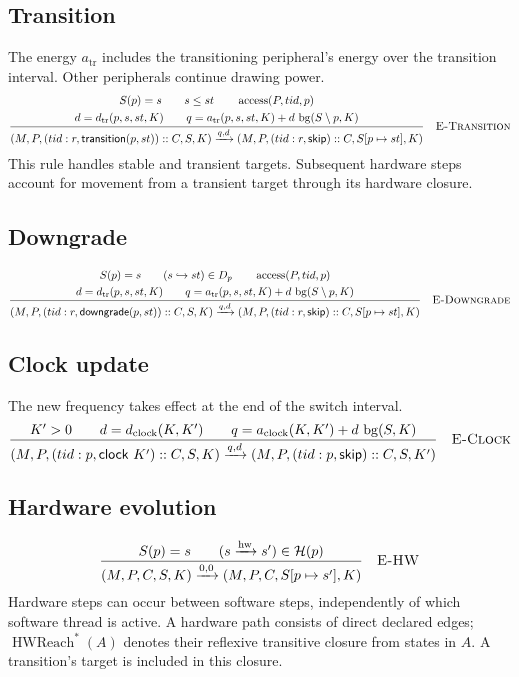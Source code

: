 \documentclass[11pt]{article}
\newcommand{\kw}[1]{\mathsf{#1}}
\newcommand{\step}[2]{\xrightarrow{#1,#2}}
\newcommand{\rulelabel}[1]{\quad\textsc{#1}}
\newcommand{\bg}{\operatorname{bg}}
\newcommand{\access}{\operatorname{access}}
\newcommand{\frm}[3]{(#1:#2,#3)}
\begin{document}
\subsection{Transition}
The energy $a_{\mathrm{tr}}$ includes the transitioning peripheral's energy
over the transition interval. Other peripherals continue drawing power.
\[
\frac{
 \begin{gathered}
 S(p)=s\qquad s\leq st\qquad\access(P,tid,p)\\
 d=d_{\mathrm{tr}}(p,s,st,K)\qquad
 q=a_{\mathrm{tr}}(p,s,st,K)+d\,\bg(S\setminus p,K)
 \end{gathered}
}{
 (M,P,\frm{tid}{r}{\kw{transition}(p,st)}::C,S,K)
 \step{q}{d}
 (M,P,\frm{tid}{r}{\kw{skip}}::C,S[p\mapsto st],K)
}\rulelabel{E-Transition}
\]
This rule handles stable and transient targets. Subsequent hardware steps
account for movement from a transient target through its hardware closure.

\subsection{Downgrade}
\[
\frac{
 \begin{gathered}
 S(p)=s\qquad(s\hookrightarrow st)\in D_p
 \qquad\access(P,tid,p)\\
 d=d_{\mathrm{tr}}(p,s,st,K)\qquad
 q=a_{\mathrm{tr}}(p,s,st,K)+d\,\bg(S\setminus p,K)
 \end{gathered}
}{
 (M,P,\frm{tid}{r}{\kw{downgrade}(p,st)}::C,S,K)
 \step{q}{d}
 (M,P,\frm{tid}{r}{\kw{skip}}::C,S[p\mapsto st],K)
}\rulelabel{E-Downgrade}
\]

\subsection{Clock update}
The new frequency takes effect at the end of the switch interval.
\[
\frac{
 K'>0\qquad d=d_{\mathrm{clock}}(K,K')
 \qquad q=a_{\mathrm{clock}}(K,K')+d\,\bg(S,K)
}{
 (M,P,\frm{tid}{p}{\kw{clock}\ K'}::C,S,K)
 \step{q}{d}
 (M,P,\frm{tid}{p}{\kw{skip}}::C,S,K')
}\rulelabel{E-Clock}
\]

\subsection{Hardware evolution}
\[
\frac{
 S(p)=s\qquad(s\xrightarrow{\mathrm{hw}}s')\in\mathcal H(p)
}{
 (M,P,C,S,K)\step{0}{0}(M,P,C,S[p\mapsto s'],K)
}\rulelabel{E-HW}
\]
Hardware steps can occur between software steps, independently of which
software thread is active. A hardware path consists of direct declared edges;
$\operatorname{HWReach}^{*}(A)$ denotes their reflexive transitive closure
from states in $A$. A transition's target is included in this closure.
\end{document}
